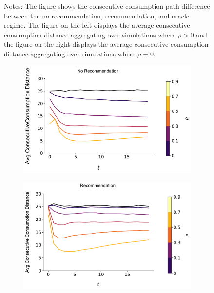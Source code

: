 \documentclass[format=acmsmall, review=true]{acmart}
\begin{document}
\begin{figure}[H]
\begin{subfigure}{.5\linewidth}
  \label{fig:sfig2}
\end{subfigure}
\caption*{\scriptsize Notes: The figure shows the consecutive consumption path difference between the no recommendation, recommendation, and oracle regime. The figure on the left displays the average consecutive consumption distance aggregating over simulations where $\rho > 0$ and the figure on the right displays the average consecutive consumption distance aggregating over simulations where $\rho = 0$.}
\label{fig:correlation_consumption_path_n_100}
\end{figure}
\addtocounter{figure}{-1}


\begin{figure}[H]
\begin{subfigure}{.45\textwidth}
\includegraphics[width=\linewidth]{figures/rho_consumption_dist_N_100T_20.pdf}
\end{subfigure}
\begin{subfigure}{.45\textwidth}
\includegraphics[width=\linewidth]{figures/rho_consumption_dist_N_100T_20_partial.pdf}

\end{subfigure}
\end{figure}
\end{document}
